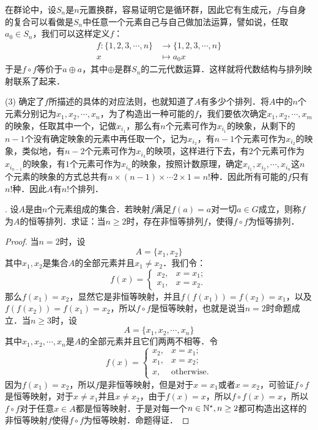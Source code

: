\noindent 在群论中，设$S_n$是$n$元置换群，容易证明它是循环群，因此它有生成元，$f$与自身的复合可以看做是$S_n$中任意一个元素自己与自己做加法运算，譬如说，任取$a_0 \in S_n$，我们可以这样定义$f$：
\begin{align}
    f: \{1,2,3,\cdots,n\} &\to \{ 1,2,3,\cdots, n\} \\
    x &\mapsto a_0 x
\end{align}
于是$f \circ f$等价于$a \oplus a$，其中$\oplus$是群$S_n$的二元代数运算．这样就将代数结构与排列映射联系了起来．

\noindent (3) 确定了$f$所描述的具体的对应法则，也就知道了$A$有多少个排列．将$A$中的$n$个元素分别记为$x_1, x_2, \cdots, x_n$，为了构造出一种可能的$f$，我们要依次确定$x_1, x_2, \cdots, x_m$的映象，任取其中一个，记做$x_{i_1}$，那么有$n$个元素可作为$x_{i_1}$的映象，从剩下的$n-1$个没有确定映象的元素中再任取一个，记为$x_{i_2}$，有$n-1$个元素可作为$x_{i_2}$的映象，类似地，有$n-2$个元素可作为$x_{i_3}$的映项，这样进行下去，有$2$个元素可作为$x_{i_{n-1}}$的映象，有$1$个元素可作为$x_{i_n}$的映象，按照计数原理，确定$x_{i_1}, x_{i_2}, \cdots, x_{i_n}$这$n$个元素的映象的方式总共有$n \times (n-1) \times \cdots 2 \times 1 = n!$种．因此所有可能的$f$只有$n!$种．因此$A$有$n!$个排列．

. 设$A$是由$n$个元素组成的集合．若映射$f$满足$f(a) = a$对一切$a \in G$成立，则称$f$为$A$的恒等排列．求证：当$n \geq 2$时，存在非恒等排列$f$，使得$f \circ f$为恒等排列．

\begin{proof}
当$n=2$时，设
\begin{equation}
    A = \{ x_1 ,x_2 \}
\end{equation}
其中$x_1, x_2$是集合$A$的全部元素并且$x_1 \neq x_2$．我们令：
\begin{equation}
    f(x) = \begin{cases}
        x_2, & x = x_1; \\
        x_1, & x = x_2. 
    \end{cases}
\end{equation}
那么$f(x_1) = x_2$，显然它是非恒等映射，并且$f(f(x_1)) = f(x_2) = x_1$，以及$f(f(x_2)) = f(x_1) = x_2$，所以$f \circ f$是恒等映射，也就是说当$n=2$时命题成立．当$n \geq 3$时，设
\begin{equation}
    A = \{ x_1, x_2, \cdots , x_n \}
\end{equation}
其中$x_1, x_2, \cdots, x_n$是$A$的全部元素并且它们两两不相等．令
\begin{equation}
    f(x) = \begin{cases}
        x_2, & x = x_1; \\
        x_1, & x = x_2; \\
        x, & \text{otherwise.}
    \end{cases}
\end{equation}
因为$f(x_1) = x_2$，所以$f$是非恒等映射，但是对于$x = x_1$或者$x = x_2$，可验证$f \circ f$是恒等映射，对于$x \neq x_1$并且$x \neq x_2$，由于$f(x) = x$，所以$f \circ f(x) = x$，所以$f \circ f$对于任意$x \in A$都是恒等映射．于是对每一个$n \in \mathbb{N}^\star, n \geq 2$都可构造出这样的非恒等映射$f$使得$f \circ f$为恒等映射．命题得证．
\end{proof}

